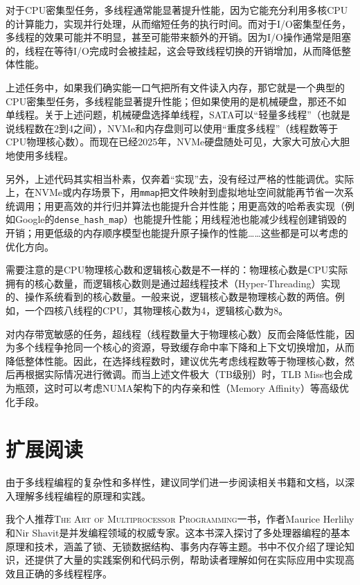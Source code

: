 对于CPU密集型任务，多线程通常能显著提升性能，因为它能充分利用多核CPU的计算能力，实现并行处理，从而缩短任务的执行时间。而对于I/O密集型任务，多线程的效果可能并不明显，甚至可能带来额外的开销。因为I/O操作通常是阻塞的，线程在等待I/O完成时会被挂起，这会导致线程切换的开销增加，从而降低整体性能。

上述任务中，如果我们确实能一口气把所有文件读入内存，那它就是一个典型的CPU密集型任务，多线程能显著提升性能；但如果使用的是机械硬盘，那还不如单线程。关于上述问题，机械硬盘选择单线程，SATA可以“轻量多线程”（也就是说线程数在2到4之间），NVMe和内存盘则可以使用“重度多线程”（线程数等于CPU物理核心数）。而现在已经2025年，NVMe硬盘随处可见，大家大可放心大胆地使用多线程。

另外，上述代码其实相当朴素，仅奔着“实现”去，没有经过严格的性能调优。实际上，在NVMe或内存场景下，用\texttt{mmap}把文件映射到虚拟地址空间就能再节省一次系统调用；用更高效的并行归并算法也能提升合并性能；用更高效的哈希表实现（例如Google的\texttt{dense\_hash\_map}）也能提升性能；用线程池也能减少线程创建销毁的开销；用更低级的内存顺序模型也能提升原子操作的性能……这些都是可以考虑的优化方向。

需要注意的是CPU物理核心数和逻辑核心数是不一样的：物理核心数是CPU实际拥有的核心数量，而逻辑核心数则是通过超线程技术（Hyper-Threading）实现的、操作系统看到的核心数量。一般来说，逻辑核心数是物理核心数的两倍。例如，一个四核八线程的CPU，其物理核心数为4，逻辑核心数为8。

对内存带宽敏感的任务，超线程（线程数量大于物理核心数）反而会降低性能，因为多个线程争抢同一个核心的资源，导致缓存命中率下降和上下文切换增加，从而降低整体性能。因此，在选择线程数时，建议优先考虑线程数等于物理核心数，然后再根据实际情况进行微调。而当上述文件极大（TB级别）时，TLB Miss也会成为瓶颈，这时可以考虑NUMA架构下的内存亲和性（Memory Affinity）等高级优化手段。

\section{扩展阅读}

由于多线程编程的复杂性和多样性，建议同学们进一步阅读相关书籍和文档，以深入理解多线程编程的原理和实践。

我个人推荐\textsc{The Art of Multiprocessor Programming}一书，作者Maurice Herlihy和Nir Shavit是并发编程领域的权威专家。这本书深入探讨了多处理器编程的基本原理和技术，涵盖了锁、无锁数据结构、事务内存等主题。书中不仅介绍了理论知识，还提供了大量的实践案例和代码示例，帮助读者理解如何在实际应用中实现高效且正确的多线程程序。